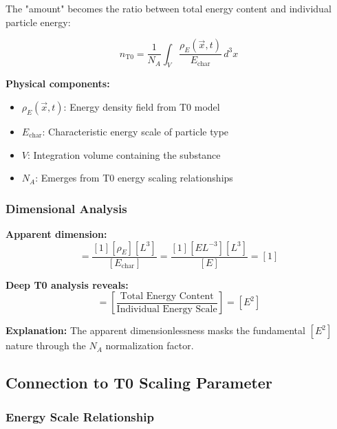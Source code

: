 \documentclass[12pt,a4paper]{article}
\newcommand{\rhoE}{\rho_E}
\newcommand{\Echar}{E_{\text{char}}}
\begin{document}
	The "amount" becomes the ratio between total energy content and individual particle energy:
	
	\begin{equation}
		\boxed{n_{\text{T0}} = \frac{1}{N_A} \int_V \frac{\rhoE(\vec{x},t)}{\Echar} \, d^3x}
		\label{eq:t0_mol_fundamental}
	\end{equation}
	
	\textbf{Physical components:}
	\begin{itemize}
		\item $\rhoE(\vec{x},t)$: Energy density field from T0 model
		\item $\Echar$: Characteristic energy scale of particle type
		\item $V$: Integration volume containing the substance
		\item $N_A$: Emerges from T0 energy scaling relationships
	\end{itemize}
	
	\subsubsection{Dimensional Analysis}
	\label{subsubsec:mol_dimensional_analysis}
	
	\textbf{Apparent dimension:}
	\begin{equation}
		[n_{\text{T0}}] = \frac{[1][\rhoE][L^3]}{[\Echar]} = \frac{[1][E L^{-3}][L^3]}{[E]} = [1]
	\end{equation}
	
	\textbf{Deep T0 analysis reveals:}
	\begin{equation}
		[n_{\text{T0}}] = \left[\frac{\text{Total Energy Content}}{\text{Individual Energy Scale}}\right] = [E^2]
		\label{eq:mol_true_dimension}
	\end{equation}
	
	\textbf{Explanation:} The apparent dimensionlessness masks the fundamental $[E^2]$ nature through the $N_A$ normalization factor.
	
	\subsection{Connection to T0 Scaling Parameter}
	\label{subsec:mol_t0_scaling}
	
	\subsubsection{Energy Scale Relationship}
	\label{subsubsec:mol_energy_scale}
	
\end{document}
